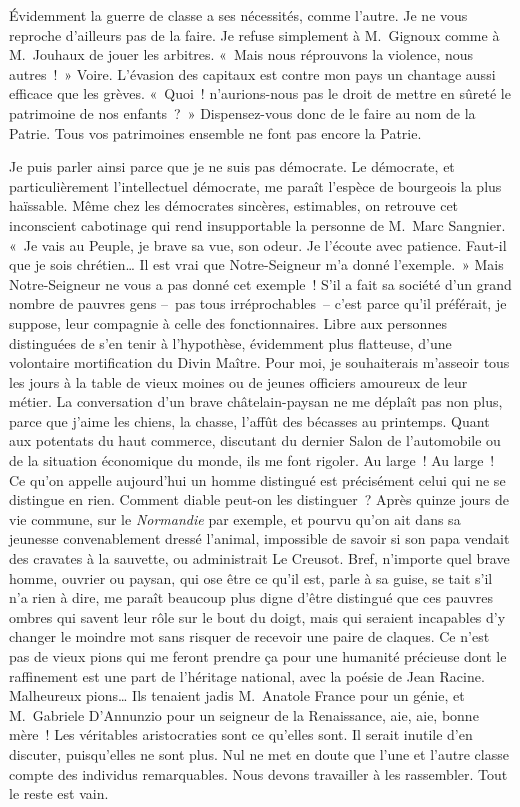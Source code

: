 \documentclass[french,twoside]{book} %
\begin{document}
Évidemment la guerre de classe a ses nécessités, comme l’autre. Je ne vous reproche d’ailleurs pas de la faire. Je refuse simplement à M. Gignoux comme à M. Jouhaux de jouer les arbitres. « Mais nous réprouvons la violence, nous autres ! » Voire. L’évasion des capitaux est contre mon pays un chantage aussi efficace que les grèves. « Quoi ! n’aurions-nous pas le droit de mettre en sûreté le patrimoine de nos enfants ? » Dispensez-vous donc de le faire au nom de la Patrie. Tous vos patrimoines ensemble ne font pas encore la Patrie.\par
Je puis parler ainsi parce que je ne suis pas démocrate. Le démocrate, et particulièrement l’intellectuel démocrate, me paraît l’espèce de bourgeois la plus haïssable. Même chez les démocrates sincères, estimables, on retrouve cet inconscient cabotinage qui rend insupportable la personne de M. Marc Sangnier. « Je vais au Peuple, je brave sa vue, son odeur. Je l’écoute avec patience. Faut-il que je sois chrétien… Il est vrai que Notre-Seigneur m’a donné l’exemple. » Mais Notre-Seigneur ne vous a pas donné cet exemple ! S’il a fait sa société d’un grand nombre de pauvres gens – pas tous irréprochables – c’est parce qu’il préférait, je suppose, leur compagnie à celle des fonctionnaires. Libre aux personnes distinguées de s’en tenir à l’hypothèse, évidemment plus flatteuse, d’une volontaire mortification du Divin Maître. Pour moi, je souhaiterais m’asseoir tous les jours à la table de vieux moines ou de jeunes officiers amoureux de leur métier. La conversation d’un brave châtelain-paysan ne me déplaît pas non plus, parce que j’aime les chiens, la chasse, l’affût des bécasses au printemps. Quant aux potentats du haut commerce, discutant du dernier Salon de l’automobile ou de la situation économique du monde, ils me font rigoler. Au large ! Au large ! Ce qu’on appelle aujourd’hui un homme distingué est précisément celui qui ne se distingue en rien. Comment diable peut-on les distinguer ? Après quinze jours de vie commune, sur le \emph{Normandie} par exemple, et pourvu qu’on ait dans sa jeunesse convenablement dressé l’animal, impossible de savoir si son papa vendait des cravates à la sauvette, ou administrait Le Creusot. Bref, n’importe quel brave homme, ouvrier ou paysan, qui ose être ce qu’il est, parle à sa guise, se tait s’il n’a rien à dire, me paraît beaucoup plus digne d’être distingué que ces pauvres ombres qui savent leur rôle sur le bout du doigt, mais qui seraient incapables d’y changer le moindre mot sans risquer de recevoir une paire de claques. Ce n’est pas de vieux pions qui me feront prendre ça pour une humanité précieuse dont le raffinement est une part de l’héritage national, avec la poésie de Jean Racine. Malheureux pions… Ils tenaient jadis M. Anatole France pour un génie, et M. Gabriele D’Annunzio pour un seigneur de la Renaissance, aie, aie, bonne mère ! Les véritables aristocraties sont ce qu’elles sont. Il serait inutile d’en discuter, puisqu’elles ne sont plus. Nul ne met en doute que l’une et l’autre classe compte des individus remarquables. Nous devons travailler à les rassembler. Tout le reste est vain.\par
\end{document}
